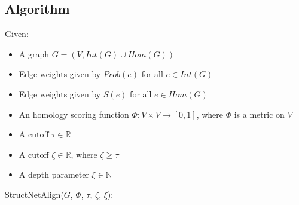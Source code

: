 \documentclass[12pt,twoside]{article}
\def\NI{\noindent}
\begin{document}
\subsection{Algorithm}

Given:
\vspace{-1em} \begin{itemize}\itemsep 0em
\item A graph $G=(V,Int(G) \cup Hom(G))$
\item Edge weights given by $Prob(e)$ for all $e \in Int(G)$
\item Edge weights given by $S(e)$ for all $e \in Hom(G)$
\item An homology scoring function $\Phi : V \times V \rightarrow [0,1]$, where $\Phi$ is a metric on $V$
\item A cutoff $\tau \in \mathbb{R}$
\item A cutoff $\zeta \in \mathbb{R}$, where $\zeta \geq \tau$
\item A depth parameter $\xi \in \mathbb{N}$
\end{itemize}
\NI StructNetAlign($G$, $\Phi$, $\tau$, $\zeta$, $\xi$):
\end{document}
